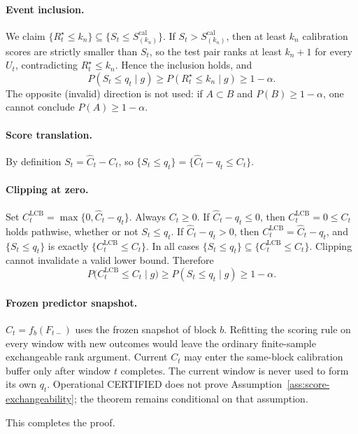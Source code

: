 \paragraph{Event inclusion.}
We claim $\{R_t^\star\le k_n\}\subseteq\{S_t\le S_{(k_n)}^{\mathrm{cal}}\}$.
If $S_t>S_{(k_n)}^{\mathrm{cal}}$, then at least $k_n$ calibration scores are
strictly smaller than $S_t$, so the test pair ranks at least $k_n+1$ for every
$U_t$, contradicting $R_t^\star\le k_n$.  Hence the inclusion holds, and
\[
 P(S_t\le q_t\mid g)
 \ge
 P(R_t^\star\le k_n\mid g)
 \ge 1-\alpha.
\]
The opposite (invalid) direction is not used: if $A\subset B$ and
$P(B)\ge 1-\alpha$, one cannot conclude $P(A)\ge 1-\alpha$.

\paragraph{Score translation.}
By definition $S_t=\widehat C_t-C_t$, so
$\{S_t\le q_t\}=\{\widehat C_t-q_t\le C_t\}$.

\paragraph{Clipping at zero.}
Set $C^{\mathrm{LCB}}_t=\max\{0,\widehat C_t-q_t\}$.  Always $C_t\ge 0$.
If $\widehat C_t-q_t\le 0$, then $C^{\mathrm{LCB}}_t=0\le C_t$ holds pathwise,
whether or not $S_t\le q_t$.  If $\widehat C_t-q_t>0$, then
$C^{\mathrm{LCB}}_t=\widehat C_t-q_t$, and $\{S_t\le q_t\}$ is exactly
$\{C^{\mathrm{LCB}}_t\le C_t\}$.  In all cases
$\{S_t\le q_t\}\subseteq\{C^{\mathrm{LCB}}_t\le C_t\}$.  Clipping cannot
invalidate a valid lower bound.  Therefore
\[
 P\bigl(C^{\mathrm{LCB}}_t\le C_t\mid g\bigr)
 \ge
 P(S_t\le q_t\mid g)
 \ge 1-\alpha.
\]

\paragraph{Frozen predictor snapshot.}
$\widehat C_t=f_b(F_{t-})$ uses the frozen snapshot of block $b$.  Refitting
the scoring rule on every window with new outcomes would leave the ordinary
finite-sample exchangeable rank argument.  Current $C_t$ may enter the
same-block calibration buffer only after window $t$ completes.  The current
window is never used to form its own $q_t$.  Operational CERTIFIED does not
prove Assumption~\ref{ass:score-exchangeability}; the theorem remains
conditional on that assumption.

This completes the proof.

